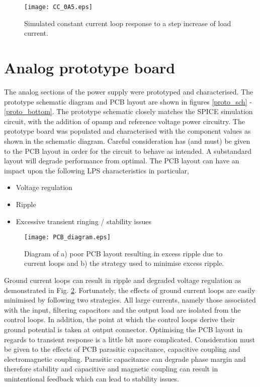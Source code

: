 \documentclass[a4paper,10pt, oneside]{article}
\begin{document}
\begin{figure}[H]
	\begin{centering}	
		\texttt{[image: CC\_0A5.eps]}
		\caption{Simulated constant current loop response to a step increase of load current.}\label{CC_0A5}
	\end{centering}	
\end{figure}
\section{Analog prototype board}
The analog sections of the power supply were prototyped and characterised. The prototype schematic diagram and PCB layout are shown in figures \ref{proto_sch} - \ref{proto_bottom}. The prototype schematic closely matches the SPICE simulation circuit, with the addition of opamp and reference voltage power circuitry. The prototype board was populated and characterised with the component values as shown in the schematic diagram. 
Careful consideration has (and must) be given to the PCB layout in order for the circuit to behave as intended. A substandard layout will degrade performance from optimal. The PCB layout can have an impact upon the following LPS characteristics in particular,
\begin{itemize}
	\item Voltage regulation
	\item Ripple
	\item Excessive transient ringing / stability issues
\end{itemize}
\begin{figure}[H]
	\begin{centering}	
		\texttt{[image: PCB\_diagram.eps]}
		\caption{Diagram of a) poor PCB layout resulting in excess ripple due to current loops and b) the strategy used to minimise excess ripple.}\label{PCB_diagram}
	\end{centering}	
\end{figure}
Ground current loops can result in ripple and degraded voltage regulation as demonstrated in Fig. \ref{PCB_diagram}. Fortunately, the effects of ground current loops are easily minimised by following two strategies. All large currents, namely those associated with the input, filtering capacitors and the output load are isolated from the control loops. In addition, the point at which the control loops derive their ground potential is taken at output connector. Optimising the PCB layout in regards to transient response is a little bit more complicated. Consideration must be given to the effects of PCB parasitic capacitance, capacitive coupling and electromagnetic coupling. Parasitic capacitance can degrade phase margin and therefore stability and capacitive and magnetic coupling can result in unintentional feedback which can lead to stability issues. 
\end{document}
